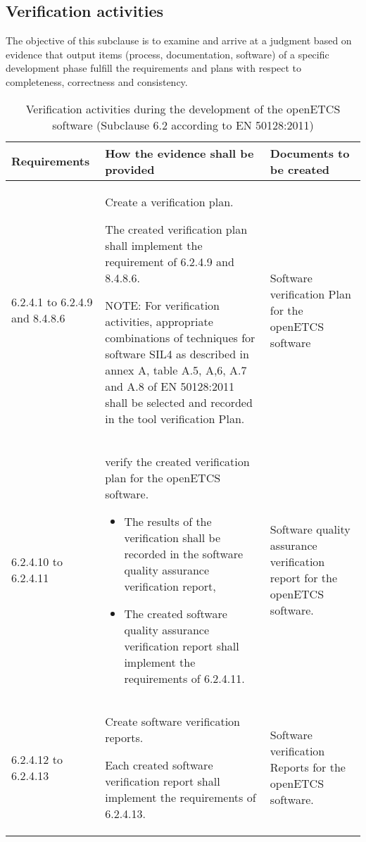 \documentclass{template/openetcs_report}
\begin{document}
\subsection{Verification activities}
\begin{flushleft}
The objective of this subclause is to examine and arrive at a judgment based on evidence that output items (process, documentation, software) of a specific development phase fulfill the requirements and plans with respect to completeness, correctness and consistency.
\end{flushleft}
{\footnotesize\sffamily\centering
\begin{longtable}{|p{2cm}|p{9cm}|p{3cm}|}
\caption{Verification activities during the development of the openETCS software (Subclause 6.2 according to EN 50128:2011)}\\
\hline
\bfseries Requirements & \bfseries How the evidence shall be provided & \bfseries Documents to be created\\
\hline
\hline
\endhead
\hline
\endfoot

6.2.4.1 to 6.2.4.9 and 8.4.8.6 & Create a verification plan.

The created verification plan shall implement the requirement of 6.2.4.9 and 8.4.8.6.

NOTE: \linebreak For verification activities, appropriate combinations of techniques for software SIL4 as described in annex A, table A.5, A,6, A.7 and A.8 of EN 50128:2011 shall be selected and recorded in the tool
verification Plan.
& Software verification Plan for the openETCS software \\ 
\hline
6.2.4.10 to 6.2.4.11 & verify the created verification plan for the openETCS software. 
\begin{itemize}\itemsep=0pt
  \item The results of the verification shall be recorded in the software quality assurance verification report,
  \item The created software quality assurance verification report shall implement the requirements of 6.2.4.11. 
\end{itemize}
& Software quality assurance verification report for the openETCS software.\\ 
\hline
6.2.4.12 to 6.2.4.13 & Create software verification reports.

Each created software verification report shall implement the requirements of 6.2.4.13.
& Software verification Reports for the openETCS software.\\ 
\hline
\end{longtable}}
\end{document}
